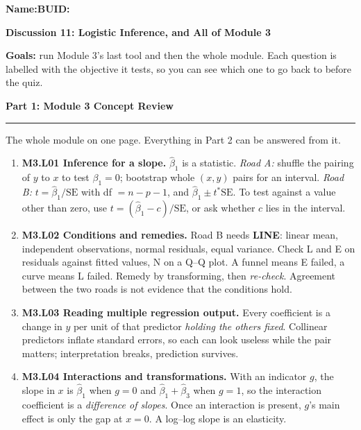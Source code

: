 \documentclass[11pt]{article}
\newcommand{\blankline}[1]{\underline{\hspace{#1}}}
\newcommand{\parttitle}[1]{%
  \par\medskip\noindent
  {\large\bfseries #1}\par
  \vspace{-.5em}\noindent\rule{\linewidth}{0.4pt}\par\smallskip}
\begin{document}
\noindent\textbf{Name:}\blankline{2.3in}\hfill\textbf{BUID:}\blankline{1.6in}

\begin{center}
  {\Large\bfseries Discussion 11: Logistic Inference, and All of Module 3}
\end{center}

\noindent\textbf{Goals:} run Module 3's last tool and then the whole module. Each question is
labelled with the objective it tests, so you can see which one to go back to before the quiz.

\parttitle{Part 1: Module 3 Concept Review}

{\small

\noindent The whole module on one page. Everything in Part 2 can be answered from it.

\begin{enumerate}[label=\textbf{\arabic*.}, wide=0pt, itemsep=.4em, topsep=.5em]

\item \textbf{M3.L01 Inference for a slope.} $\hat\beta_1$ is a statistic. \emph{Road A:} shuffle the
pairing of $y$ to $x$ to test $\beta_1 = 0$; bootstrap whole $(x,y)$ pairs for an interval.
\emph{Road B:} $t = \hat\beta_1/\text{SE}$ with df $= n-p-1$, and
$\hat\beta_1 \pm t^{\ast}\text{SE}$. To test against a value other than zero, use
$t = (\hat\beta_1 - c)/\text{SE}$, or ask whether $c$ lies in the interval.

\item \textbf{M3.L02 Conditions and remedies.} Road B needs \textbf{LINE}: linear mean, independent
observations, normal residuals, equal variance. Check L and E on residuals against fitted values, N
on a Q--Q plot. A funnel means E failed, a curve means L failed. Remedy by transforming, then
\emph{re-check}. Agreement between the two roads is not evidence that the conditions hold.

\item \textbf{M3.L03 Reading multiple regression output.} Every coefficient is a change in $y$ per
unit of that predictor \emph{holding the others fixed}. Collinear predictors inflate standard errors,
so each can look useless while the pair matters; interpretation breaks, prediction survives.

\item \textbf{M3.L04 Interactions and transformations.} With an indicator $g$, the slope in $x$ is
$\hat\beta_1$ when $g=0$ and $\hat\beta_1+\hat\beta_3$ when $g=1$, so the interaction coefficient is
a \emph{difference of slopes}. Once an interaction is present, $g$'s main effect is only the gap at
$x=0$. A log--log slope is an elasticity.


\end{enumerate}}
\end{document}
